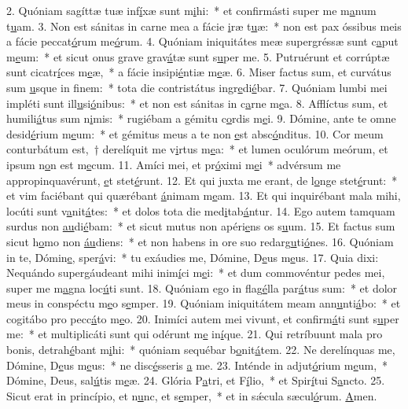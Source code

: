 2. Quóniam sagíttæ tuæ inf\uline{í}xæ sunt m\uline{i}hi:~* et confirmásti super me m\uline{a}num t\uline{u}am.
3. Non est sánitas in carne mea a fácie \uline{i}ræ t\uline{u}æ:~* non est pax óssibus meis a fácie peccat\uline{ó}rum me\uline{ó}rum.
4. Quóniam iniquitátes meæ supergréssæ sunt c\uline{a}put m\uline{e}um:~* et sicut onus grave grav\uline{á}tæ sunt s\uline{u}per me.
5. Putruérunt et corrúptæ sunt cicatr\uline{í}ces m\uline{e}æ,~* a fácie insipi\uline{é}ntiæ m\uline{e}æ.
6. Miser factus sum, et curvátus sum \uline{u}sque in f\uline{i}nem:~* tota die contristátus ingr\uline{e}di\uline{é}bar.
7. Quóniam lumbi mei impléti sunt ill\uline{u}si\uline{ó}nibus:~* et non est sánitas in c\uline{a}rne m\uline{e}a.
8. Afflíctus sum, et humili\uline{á}tus sum n\uline{i}mis:~* rugiébam a gémitu c\uline{o}rdis m\uline{e}i.
9. Dómine, ante te omne desid\uline{é}rium m\uline{e}um:~* et gémitus meus a te non \uline{e}st absc\uline{ó}nditus.
10. Cor meum conturbátum est,~† derelíquit me v\uline{i}rtus m\uline{e}a:~* et lumen oculórum meórum, et ipsum n\uline{o}n est m\uline{e}cum.
11. Amíci mei, et pr\uline{ó}ximi m\uline{e}i~* advérsum me appropinquavérunt, \uline{e}t stet\uline{é}runt.
12. Et qui juxta me erant, de l\uline{o}nge stet\uline{é}runt:~* et vim faciébant qui quærébant \uline{á}nimam m\uline{e}am.
13. Et qui inquirébant mala mihi, locúti sunt v\uline{a}nit\uline{á}tes:~* et dolos tota die med\uline{i}tab\uline{á}ntur.
14. Ego autem tamquam surdus non \uline{au}di\uline{é}bam:~* et sicut mutus non apéri\uline{e}ns os s\uline{u}um.
15. Et factus sum sicut h\uline{o}mo non \uline{áu}diens:~* et non habens in ore suo redarg\uline{u}ti\uline{ó}nes.
16. Quóniam in te, Dómin\uline{e}, sper\uline{á}vi:~* tu exáudies me, Dómine, D\uline{e}us m\uline{e}us.
17. Quia dixi: Nequándo supergáudeant mihi inim\uline{í}ci m\uline{e}i:~* et dum commovéntur pedes mei, super me m\uline{a}gna loc\uline{ú}ti sunt.
18. Quóniam ego in flag\uline{é}lla par\uline{á}tus sum:~* et dolor meus in conspéctu m\uline{e}o s\uline{e}mper.
19. Quóniam iniquitátem meam ann\uline{u}nti\uline{á}bo:~* et cogitábo pro pecc\uline{á}to m\uline{e}o.
20. Inimíci autem mei vivunt, et confirm\uline{á}ti sunt s\uline{u}per me:~* et multiplicáti sunt qui odérunt m\uline{e} in\uline{í}que.
21. Qui retríbuunt mala pro bonis, detrah\uline{é}bant m\uline{i}hi:~* quóniam sequébar b\uline{o}nit\uline{á}tem.
22. Ne derelínquas me, Dómine, D\uline{e}us m\uline{e}us:~* ne disc\uline{é}sseris \uline{a} me.
23. Inténde in adjut\uline{ó}rium m\uline{e}um,~* Dómine, Deus, sal\uline{ú}tis m\uline{e}æ.
24. Glória P\uline{a}tri, et F\uline{í}lio,~* et Spir\uline{í}tui S\uline{a}ncto.
25. Sicut erat in princípio, et n\uline{u}nc, et s\uline{e}mper,~* et in sǽcula sæcul\uline{ó}rum. \uline{A}men.
